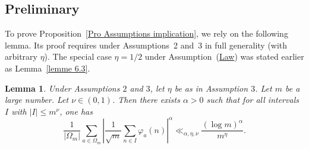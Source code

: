 \documentclass[12pt]{amsart}
\newtheorem{lem}[thm]{Lemma}
\theoremstyle{definition}
\numberwithin{equation}{section}
\numberwithin{equation}{section}
\begin{document}
\subsection{Preliminary}

To prove Proposition~\ref{Pro Assumptions implication}, we rely on the following lemma. Its proof requires \cite[Lemma 6.1]{ABL21} under Assumptions~2 and~3 in full generality (with arbitrary \(\eta\)). The special case \(\eta=1/2\) under Assumption~(\hyperlink{Ass Law}{Law}) was stated earlier as Lemma~\ref{lemme 6.3}.

\begin{lem}\label{lem sum courte, alpha, eta, nu} Under Assumptions $2$ and $3$, let $\eta$ be as in Assumption $3$. Let $m$ be a large number. Let $\nu \in (0,1)$. Then there exists $\alpha >0$ such that for all intervals $I$ with $|I|\leq m^\nu$, one has
\[
\frac{1}{|\Omega_m|}\sum_{a\in \Omega_m} \left|
\frac{1}{\sqrt{m}}\sum_{n\in I} \varphi_a(n)\right|^\alpha \ll_{\alpha, \eta,\nu} \frac{(\log m)^\alpha}{m^\eta}.
\]  
\end{lem}
\end{document}
